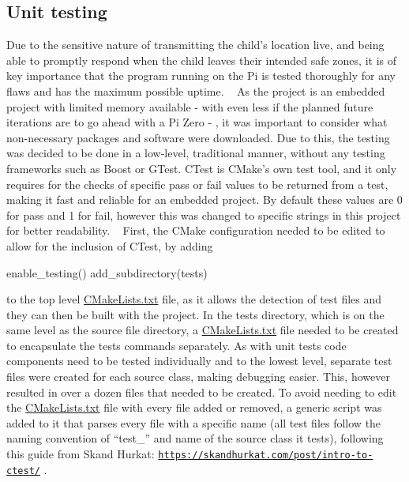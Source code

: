\subsection*{Unit testing}

Due to the sensitive nature of transmitting the child’s location live, and being able to promptly respond when the child leaves their intended safe zones, it is of key importance that the program running on the Pi is tested thoroughly for any flaws and has the maximum possible uptime. ~\newline
 As the project is an embedded project with limited memory available -\/ with even less if the planned future iterations are to go ahead with a Pi Zero -\/ , it was important to consider what non-\/necessary packages and software were downloaded. Due to this, the testing was decided to be done in a low-\/level, traditional manner, without any testing frameworks such as Boost or G\+Test. C\+Test is C\+Make’s own test tool, and it only requires for the checks of specific pass or fail values to be returned from a test, making it fast and reliable for an embedded project. By default these values are 0 for pass and 1 for fail, however this was changed to specific strings in this project for better readability. ~\newline
 First, the C\+Make configuration needed to be edited to allow for the inclusion of C\+Test, by adding 
\begin{DoxyCode}
enable\_testing()
add\_subdirectory(tests)
\end{DoxyCode}
 to the top level \hyperlink{_c_make_lists_8txt}{C\+Make\+Lists.\+txt} file, as it allows the detection of test files and they can then be built with the project. In the tests directory, which is on the same level as the source file directory, a \hyperlink{_c_make_lists_8txt}{C\+Make\+Lists.\+txt} file needed to be created to encapsulate the tests commands separately. As with unit tests code components need to be tested individually and to the lowest level, separate test files were created for each source class, making debugging easier. This, however resulted in over a dozen files that needed to be created. To avoid needing to edit the \hyperlink{_c_make_lists_8txt}{C\+Make\+Lists.\+txt} file with every file added or removed, a generic script was added to it that parses every file with a specific name (all test files follow the naming convention of “test\+\_\+” and name of the source class it tests), following this guide from Skand Hurkat\+: \href{https://skandhurkat.com/post/intro-to-ctest/}{\tt https\+://skandhurkat.\+com/post/intro-\/to-\/ctest/} . 
